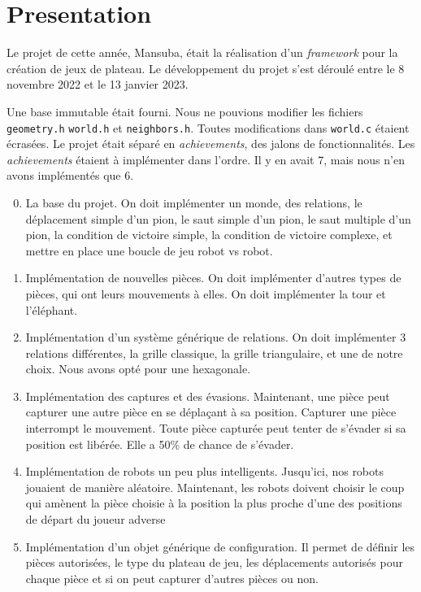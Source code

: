 \section{Presentation}

Le projet de cette année, Mansuba, était la réalisation d'un \emph{framework} pour la création de jeux de plateau.
Le développement du projet s'est déroulé entre le 8 novembre 2022 et le 13 janvier 2023.

Une base immutable était fourni. Nous ne pouvions modifier les fichiers \verb|geometry.h| \verb|world.h| et \verb|neighbors.h|.
Toutes modifications dans \verb|world.c| étaient écrasées.
Le projet était séparé en \emph{achievements}, des jalons de fonctionnalités.
Les \emph{achievements} étaient à implémenter dans l'ordre.
Il y en avait 7, mais nous n'en avons implémentés que 6.

\begin{enumerate}
    \setcounter{enumi}{-1}
    \item La base du projet. On doit implémenter un monde, 
    des relations, le déplacement simple d'un pion, 
    le saut simple d'un pion, le saut multiple d'un pion, 
    la condition de victoire simple, la condition de victoire complexe,
    et mettre en place une boucle de jeu robot vs robot.
    \item Implémentation de nouvelles pièces. On doit implémenter d'autres
    types de pièces, qui ont leurs mouvements à elles. On doit implémenter la tour et l'éléphant.
    \item Implémentation d'un système générique de relations. On doit implémenter
    3 relations différentes, la grille classique, la grille triangulaire, et une de notre choix. Nous avons opté pour une hexagonale.
    \item Implémentation des captures et des évasions. Maintenant, une pièce peut capturer une autre pièce
    en se déplaçant à sa position. Capturer une pièce interrompt le mouvement. Toute pièce capturée
    peut tenter de s'évader si sa position est libérée. Elle a 50\% de chance de s'évader.
    \item Implémentation de robots un peu plus intelligents. Jusqu'ici, nos robots jouaient de manière aléatoire.
    Maintenant, les robots doivent choisir le coup qui amènent la pièce choisie à la position la plus proche
    d'une des positions de départ du joueur adverse
    \item Implémentation d'un objet générique de configuration. Il permet de définir 
    les pièces autorisées, le type du plateau de jeu, les déplacements autorisés pour chaque pièce
    et si on peut capturer d'autres pièces ou non. 
\end{enumerate}

